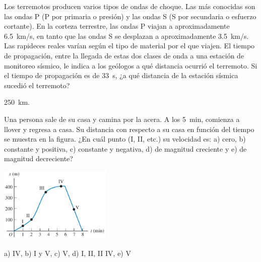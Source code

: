 \documentclass[11pt]{article}
\begin{document}
\begin{exercise}
Los terremotos producen varios tipos de ondas de choque. Las más conocidas son las ondas P (P por primaria o presión) y las ondas S (S por secundaria o esfuerzo cortante). En la corteza terrestre, las ondas P viajan a aproximadamente \qty{6.5}{km/s}, en tanto que las ondas S se desplazan a aproximadamente \qty{3.5}{km/s}. Las rapideces reales varían según el tipo de material por
el que viajen. El tiempo de propagación, entre la llegada de estas dos clases de onda a una estación de monitoreo sísmico, le indica a los geólogos a qué distancia ocurrió el terremoto. Si el tiempo de propagación es de \qty{33}{s}, ¿a qué distancia de la estación sísmica sucedió el terremoto?
\end{exercise}
\begin{solution}
    \qty{250}{km}.
\end{solution}

\begin{exercise}
\begin{multicols}{2}
    Una persona sale de su casa y camina por la acera. A los \qty{5}{min}, comienza a llover y  regresa a casa. Su distancia con respecto a su casa en función del tiempo se muestra en la figura. ¿En cuál punto (I, II, etc.) su velocidad es: a) cero, b) constante y positiva, c) constante y negativa, d) de magnitud creciente y e) de magnitud decreciente?
\begin{center}
    \includegraphics[width=0.4\textwidth]{figs/activ-03.png}
\end{center}
\end{multicols}
\end{exercise}
\begin{solution}
     a) IV, b) I y V, c) V, d) I, II, II IV, e) V
\end{solution}
\end{document}
